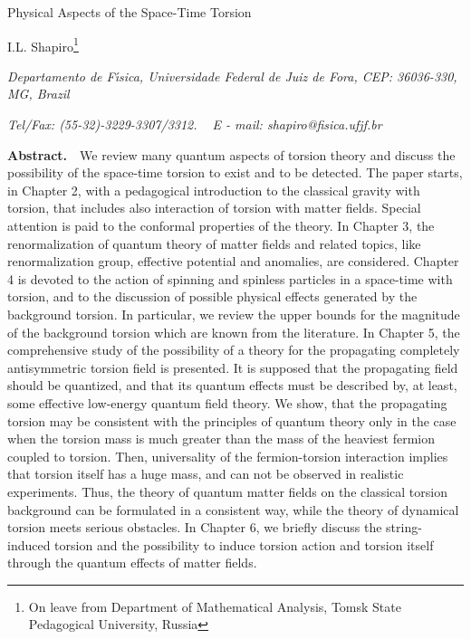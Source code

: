 \thispagestyle{empty}
\begin{center}


{\large\sc Physical Aspects of the Space-Time Torsion}
\vskip 2mm

{I.L. Shapiro}\footnote
{On leave from 
Department of Mathematical Analysis, Tomsk 
State Pedagogical University, Russia} 
\vskip 2mm

{\small
\it Departamento de F{\'\i}sica, Universidade Federal de Juiz 
de Fora, CEP: 36036-330, MG, Brazil}

{\small
\it Tel/Fax: (55-32)-3229-3307/3312. $\,\,\,$ E - mail:  
shapiro@fisica.ufjf.br}
\vskip 2mm



\end{center} 
\vskip 6mm

\noindent
{\bf Abstract.} 
$\,\,$ We review many quantum aspects of torsion theory and 
discuss the possibility of the space-time torsion to exist 
and to be detected. The paper starts, in Chapter 2, with a
pedagogical introduction to the classical gravity with torsion, 
that includes also interaction of torsion with matter fields.
Special attention is paid to the conformal properties of the
theory. In Chapter 3, the renormalization of quantum theory of 
matter fields and related topics, like renormalization group,
effective potential and anomalies, are considered. Chapter 4 is 
devoted to the action of spinning and spinless particles in 
a space-time with torsion, and to the discussion of  
possible physical effects generated by the background torsion. 
In particular, we review the upper bounds for the magnitude of 
the background torsion which are known from the literature.  
In Chapter 5, the comprehensive study of the possibility of a
theory for the propagating completely antisymmetric torsion 
field is presented. It is supposed that the propagating field 
should be quantized, and that its quantum effects must be 
described by, at least, some effective low-energy quantum field 
theory. We show, that the propagating torsion may be consistent 
with the principles of quantum theory only in the case when 
the torsion mass is much greater than the mass of the heaviest 
fermion coupled to torsion. Then, universality of the 
fermion-torsion interaction implies that torsion itself has a 
huge mass, and can not be observed in realistic experiments. 
Thus, the theory of quantum matter fields on the classical 
torsion background can be formulated in a consistent way, while 
the theory of dynamical torsion meets serious obstacles. In 
Chapter 6, we briefly discuss the string-induced torsion and 
the possibility to induce torsion action and torsion itself 
through the quantum effects of matter fields.
\vskip 6mm
\vskip 6mm

